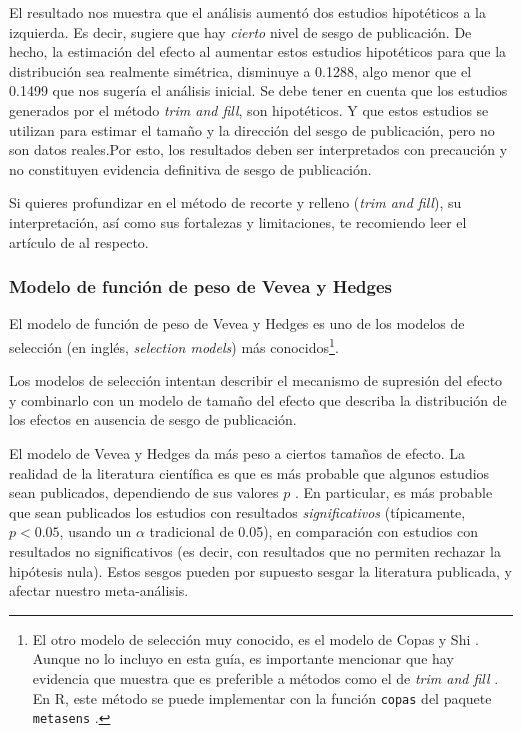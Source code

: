 \documentclass[
  bookmarksnumbered]{article}
\begin{document}
El resultado nos muestra que el análisis aumentó dos estudios hipotéticos a la izquierda. Es decir, sugiere que hay \emph{cierto} nivel de sesgo de publicación. De hecho, la estimación del efecto al aumentar estos estudios hipotéticos para que la distribución sea realmente simétrica, disminuye a 0.1288, algo menor que el 0.1499 que nos sugería el análisis inicial. Se debe tener en cuenta que los estudios generados por el método \emph{trim and fill}, son hipotéticos. Y que estos estudios se utilizan para estimar el tamaño y la dirección del sesgo de publicación, pero no son datos reales.Por esto, los resultados deben ser interpretados con precaución y no constituyen evidencia definitiva de sesgo de publicación.

Si quieres profundizar en el método de recorte y relleno (\emph{trim and fill}), su interpretación, así como sus fortalezas y limitaciones, te recomiendo leer el artículo de \textcite{shiTrimandfill2019} al respecto.

\hypertarget{vevea-hedges}{%
\subsubsection{Modelo de función de peso de Vevea y Hedges}\label{vevea-hedges}}

El modelo de función de peso de Vevea y Hedges \autocites*{veveaGeneralLinearModel1995}[ver también][]{veveaPublicationBiasResearch2005} es uno de los modelos de selección (en inglés, \emph{selection models}) más conocidos\footnote{El otro modelo de selección muy conocido, es el modelo de Copas y Shi \autocite*{copasMetaanalysisFunnelPlots2000,copasSensitivityAnalysisPublication2001}. Aunque no lo incluyo en esta guía, es importante mencionar que hay evidencia que muestra que es preferible a métodos como el de \emph{trim and fill} \autocite{schwarzerEmpiricalEvaluationSuggests2010}. En R, este método se puede implementar con la función \texttt{copas} del paquete \texttt{metasens} \autocites{schwarzerMetasensPackage}[ver también Capítulo 5 en][]{schwarzerMetaAnalysis2015}.}.

Los modelos de selección intentan describir el mecanismo de supresión del efecto y combinarlo con un modelo de tamaño del efecto que describa la distribución de los efectos en ausencia de sesgo de publicación.

El modelo de Vevea y Hedges da más peso a ciertos tamaños de efecto. La realidad de la literatura científica es que es más probable que algunos estudios sean publicados, dependiendo de sus valores \(p\) \autocites{coburnPublicationBiasFunction2015}[para una descripción sencilla y general, ver por ejemplo][]{SesgoPublicacion2008}. En particular, es más probable que sean publicados los estudios con resultados \emph{significativos} (típicamente, \(p < 0.05\), usando un \(\alpha\) tradicional de 0.05), en comparación con estudios con resultados no significativos (es decir, con resultados que no permiten rechazar la hipótesis nula). Estos sesgos pueden por supuesto sesgar la literatura publicada, y afectar nuestro meta-análisis.
\end{document}
